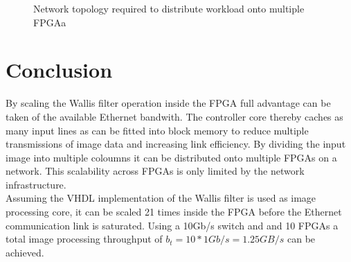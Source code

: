 \begin{figure}[tb!]
    \centering
    \begin{adjustbox}{max width=\linewidth}
        
    \end{adjustbox}
    \caption{Network topology required to distribute workload onto multiple
    FPGAa}
    \label{fig:sca:network}
\end{figure}

\section{Conclusion}
By scaling the Wallis filter operation inside the FPGA full advantage can be
taken of the available Ethernet bandwith. The controller core thereby caches as
many input lines as can be fitted into block memory to reduce multiple
transmissions of image data and increasing link efficiency. By dividing the input
image into multiple coloumns it can be distributed onto multiple FPGAs on a
network. This scalability across FPGAs is only limited by the network
infrastructure.
\\

Assuming the VHDL implementation of the Wallis filter is used as image
processing core, it can be scaled 21 times inside the FPGA before the Ethernet
communication link is saturated. Using a 10Gb/s switch and and 10 FPGAs a total
image processing throughput of $b_t=10*1Gb/s=1.25GB/s$ can be achieved.


